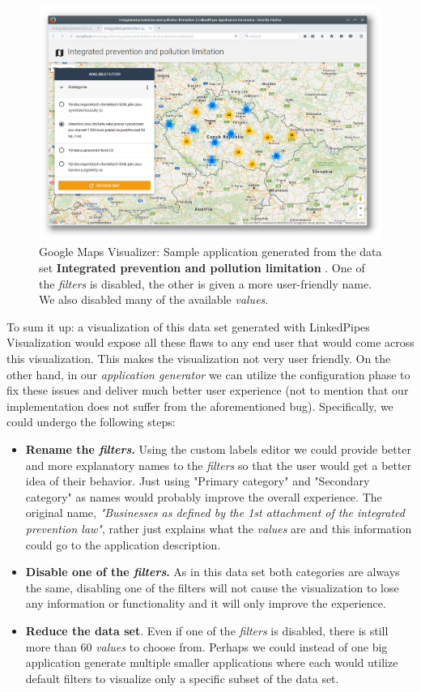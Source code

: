 \begin{figure}
	\centering
	\includegraphics[width=145mm]{img/06_map_fixed_example}
	\caption{Google Maps Visualizer: Sample application generated from the data set \textbf{Integrated prevention and pollution limitation} \cite{prevention-and-pollution-limitation}. One of the \emph{filters} is disabled, the other is given a more user-friendly name. We also disabled many of the available \emph{values}.}
    \label{fig:map-fixed-example}
\end{figure}

To sum it up: a visualization of this data set generated with LinkedPipes Visualization would expose all these flaws to any end user that would come across this visualization. This makes the visualization not very user friendly. On the other hand, in our \emph{application generator} we can utilize the configuration phase to fix these issues and deliver much better user experience (not to mention that our implementation does not suffer from the aforementioned bug). Specifically, we could undergo the following steps:

\begin{itemize}
\item \textbf{Rename the \emph{filters}.} Using the custom labels editor we could provide better and more explanatory names to the \emph{filters} so that the user would get a better idea of their behavior. Just using "Primary category" and "Secondary category" as names would probably improve the overall experience. The original name, \textit{"Businesses as defined by the 1st attachment of the integrated prevention law"}, rather just explains what the \emph{values} are and this information could go to the application description.
\item \textbf{Disable one of the \emph{filters}.} As in this data set both categories are always the same, disabling one of the filters will not cause the visualization to lose any information or functionality and it will only improve the experience.
\item \textbf{Reduce the data set}. Even if one of the \emph{filters} is disabled, there is still more than 60 \emph{values} to choose from. Perhaps we could instead of one big application generate multiple smaller applications where each would utilize default filters to visualize only a specific subset of the data set.
\end{itemize}

